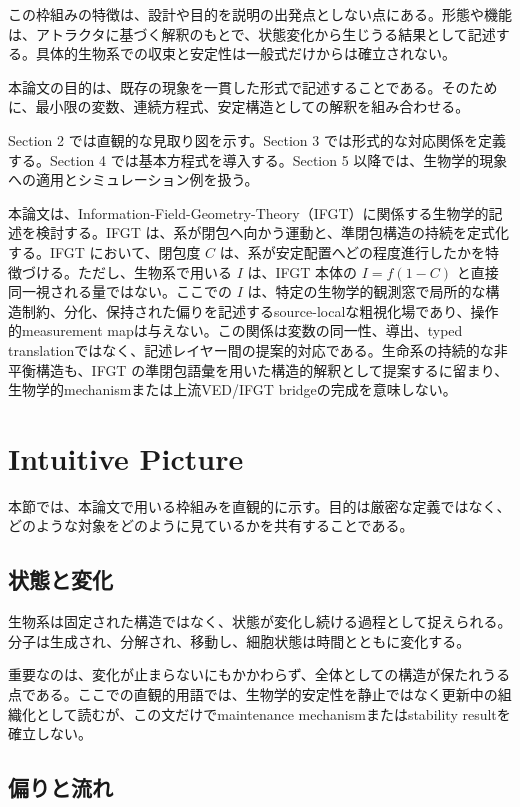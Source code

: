 \documentclass[11pt]{ltjsarticle}
\newcommand{\I}{I}
\begin{document}
この枠組みの特徴は、設計や目的を説明の出発点としない点にある。形態や機能は、アトラクタに基づく解釈のもとで、状態変化から生じうる結果として記述する。具体的生物系での収束と安定性は一般式だけからは確立されない。

本論文の目的は、既存の現象を一貫した形式で記述することである。そのために、最小限の変数、連続方程式、安定構造としての解釈を組み合わせる。

Section 2 では直観的な見取り図を示す。Section 3 では形式的な対応関係を定義する。Section 4 では基本方程式を導入する。Section 5 以降では、生物学的現象への適用とシミュレーション例を扱う。

本論文は、Information-Field-Geometry-Theory（IFGT）に関係する生物学的記述を検討する。IFGT は、系が閉包へ向かう運動と、準閉包構造の持続を定式化する。IFGT において、閉包度 \(C\) は、系が安定配置へどの程度進行したかを特徴づける。ただし、生物系で用いる \(\I\) は、IFGT 本体の \(I=f(1-C)\) と直接同一視される量ではない。ここでの \(\I\) は、特定の生物学的観測窓で局所的な構造制約、分化、保持された偏りを記述するsource-localな粗視化場であり、操作的measurement mapは与えない。この関係は変数の同一性、導出、typed translationではなく、記述レイヤー間の提案的対応である。生命系の持続的な非平衡構造も、IFGT の準閉包語彙を用いた構造的解釈として提案するに留まり、生物学的mechanismまたは上流VED/IFGT bridgeの完成を意味しない。

\section{Intuitive Picture}

本節では、本論文で用いる枠組みを直観的に示す。目的は厳密な定義ではなく、どのような対象をどのように見ているかを共有することである。

\subsection{状態と変化}

生物系は固定された構造ではなく、状態が変化し続ける過程として捉えられる。分子は生成され、分解され、移動し、細胞状態は時間とともに変化する。

重要なのは、変化が止まらないにもかかわらず、全体としての構造が保たれうる点である。ここでの直観的用語では、生物学的安定性を静止ではなく更新中の組織化として読むが、この文だけでmaintenance mechanismまたはstability resultを確立しない。

\subsection{偏りと流れ}
\end{document}
